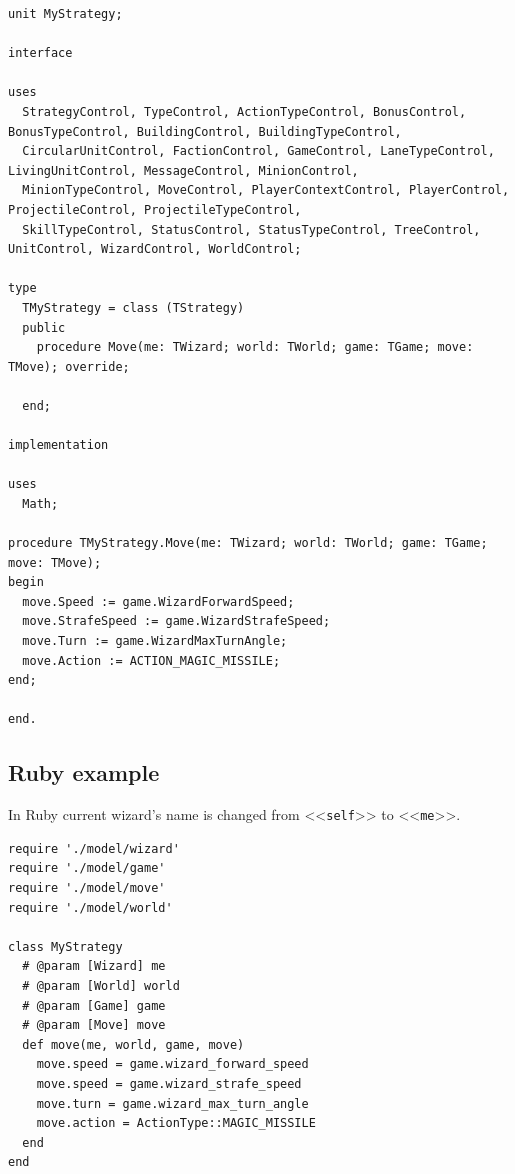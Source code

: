 \begin{verbatim}
unit MyStrategy;

interface

uses
  StrategyControl, TypeControl, ActionTypeControl, BonusControl, BonusTypeControl, BuildingControl, BuildingTypeControl,
  CircularUnitControl, FactionControl, GameControl, LaneTypeControl, LivingUnitControl, MessageControl, MinionControl,
  MinionTypeControl, MoveControl, PlayerContextControl, PlayerControl, ProjectileControl, ProjectileTypeControl,
  SkillTypeControl, StatusControl, StatusTypeControl, TreeControl, UnitControl, WizardControl, WorldControl;

type
  TMyStrategy = class (TStrategy)
  public
    procedure Move(me: TWizard; world: TWorld; game: TGame; move: TMove); override;

  end;

implementation

uses
  Math;
    
procedure TMyStrategy.Move(me: TWizard; world: TWorld; game: TGame; move: TMove);
begin
  move.Speed := game.WizardForwardSpeed;
  move.StrafeSpeed := game.WizardStrafeSpeed;
  move.Turn := game.WizardMaxTurnAngle;
  move.Action := ACTION_MAGIC_MISSILE;
end;

end.
\end{verbatim}

\newpage
\subsection{Ruby example}

In Ruby current wizard's name is changed from <<\texttt{self}>> to <<\texttt{me}>>.

\begin{verbatim}
require './model/wizard'
require './model/game'
require './model/move'
require './model/world'

class MyStrategy
  # @param [Wizard] me
  # @param [World] world
  # @param [Game] game
  # @param [Move] move
  def move(me, world, game, move)
    move.speed = game.wizard_forward_speed
    move.speed = game.wizard_strafe_speed
    move.turn = game.wizard_max_turn_angle
    move.action = ActionType::MAGIC_MISSILE
  end
end
\end{verbatim}
